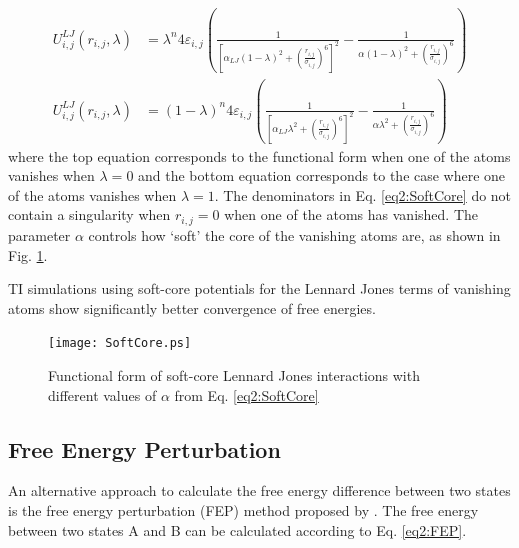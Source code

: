 \begin{align}
   U^{LJ}_{i,j}(r_{i,j}, \lambda) & = \lambda ^ n 4 \varepsilon_{i,j} \left(
      \frac 1 {\left[ \alpha_{LJ} (1-\lambda)^2 + \left( \frac {r_{i,j}}
      {\sigma_{i,j}} \right) ^ 6 \right] ^ 2} - \frac 1 {\alpha(1-\lambda)^2 +
      \left( \frac {r_{i,j}} {\sigma_{i,j}} \right) ^ 6} \right) \nonumber \\
   U^{LJ}_{i,j}(r_{i,j}, \lambda) & = (1-\lambda) ^ n 4 \varepsilon_{i,j} \left(
      \frac 1 {\left[ \alpha_{LJ} \lambda^2 + \left( \frac {r_{i,j}}
      {\sigma_{i,j}} \right) ^ 6 \right] ^ 2} - \frac 1 {\alpha \lambda^2 +
      \left( \frac {r_{i,j}} {\sigma_{i,j}} \right) ^ 6} \right)
   \label{eq2:SoftCore}
\end{align}
where the top equation corresponds to the functional form when one of the atoms
vanishes when $\lambda = 0$ and the bottom equation corresponds to the case
where one of the atoms vanishes when $\lambda = 1$. The denominators in Eq.
\ref{eq2:SoftCore} do not contain a singularity when $r_{i,j} = 0$ when one of
the atoms has vanished. The parameter $\alpha$ controls how `soft' the core of
the vanishing atoms are, as shown in Fig. \ref{fig2:SoftCore}.
\cite{Steinbrecher_JChemPhys_2007_v127_p214108}

TI simulations using soft-core potentials for the Lennard Jones terms of
vanishing atoms show significantly better convergence of free energies.
\cite{Steinbrecher_JChemPhys_2007_v127_p214108, Steinbrecher2011}

\begin{figure}
   \texttt{[image: SoftCore.ps]}
   \caption{Functional form of soft-core Lennard Jones interactions with
            different values of $\alpha$ from Eq. \ref{eq2:SoftCore}}
   \label{fig2:SoftCore}
\end{figure}

\subsection{Free Energy Perturbation}

An alternative approach to calculate the free energy difference between two
states is the free energy perturbation (FEP) method proposed by
\citeauthor{Zwanzig_JChemPhys_1954_v22_p1420}.
\cite{Zwanzig_JChemPhys_1954_v22_p1420} The free energy between two states A and
B can be calculated according to Eq. \ref{eq2:FEP}.

